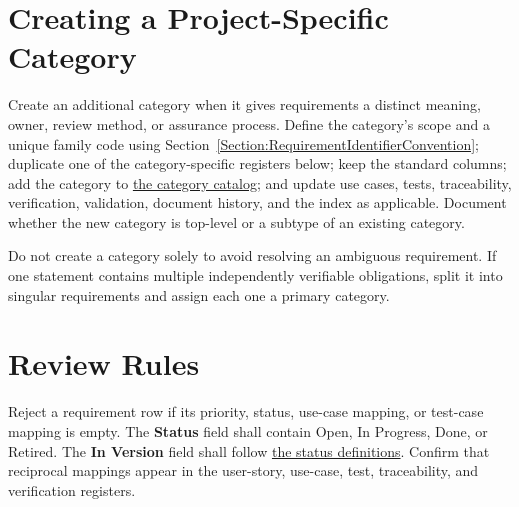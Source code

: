 \section{Creating a Project-Specific Category}
Create an additional category when it gives requirements a distinct meaning,
owner, review method, or assurance process. Define the category's scope and a
unique family code using
Section~\ref{Section:RequirementIdentifierConvention}; duplicate one of the
category-specific registers below; keep the standard columns; add the category to
\hyperref[Table:RequirementCategoryCatalog]{the category catalog}; and update
use cases, tests, traceability, verification, validation, document history, and
the index as applicable. Document whether the new category is top-level or a
subtype of an existing category.

Do not create a category solely to avoid resolving an ambiguous requirement.
If one statement contains multiple independently verifiable obligations, split
it into singular requirements and assign each one a primary category.

\section{Review Rules}
Reject a requirement row if its priority, status, use-case mapping, or test-case
mapping is empty. The \textbf{Status} field shall contain Open, In Progress,
Done, or Retired. The \textbf{In Version} field shall follow
\hyperref[Table:RequirementStatusDefinitions]{the status definitions}. Confirm
that reciprocal mappings appear in the user-story, use-case, test,
traceability, and verification registers.

